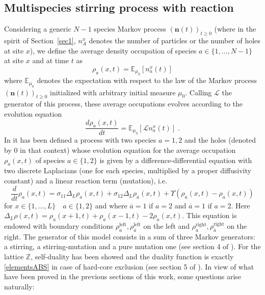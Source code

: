 \documentclass[10pt]{article}
\numberwithin{equation}{section}
\numberwithin{equation}{subsection}
\newcommand{\dt}{\;.}
\begin{document}
\subsection{Multispecies stirring process with reaction} \label{Subsection-RD}
{\color{black}  Considering a generic $N-1$ species Markov process $(\bm{n}(t))_{t\geq 0}$ (where in the spirit of Section~\ref{sec1}, $n_{A}^{x}$ denotes the number of particles or the number of holes at site $x$), we define the average density occupation of species $a\in\{1,\ldots,N-1\}$ at site $x$ and at time $t$ as
\begin{equation}
	\rho_{a}(x,t)=\mathbb{E}_{\mu_{0}}\left[n_{a}^{x}(t)\right]
\end{equation}
where $\mathbb{E}_{\mu_{0}}$ denotes the expectation with respect to the law of the Markov process $(\bm{n}(t))_{t\geq 0}$ initialized with arbitrary initial measure $\mu_{0}$. Calling
$\mathcal{L}$ the generator of this process, these average occupations evolves according to the evolution equation
\begin{equation}\label{EE-density}
	\frac{d \rho_{a}(x,t)}{dt}=\mathbb{E}_{\mu_{0}}\left[\mathcal{L}n_{a}^{x}(t)\right]\dt
\end{equation} }
In \cite{casini2022uphill} {\color{black}it has been defined a process with two species $a=1,2$ and the holes (denoted by $0$ in that context)} whose evolution equation for the average occupation $\rho_{a}(x,t)$ of species $a\in \{1,2\}$ is given by a difference-differential equation with two discrete Laplacians (one for each species, multiplied by a proper diffusivity constant) and a linear reaction term (mutation), i.e.
\begin{equation}\label{2SpeciesRD}
	\frac{d}{dt} \rho_{a}(x,t)=\sigma_{11}\Delta_{L}\rho_{a}(x,t)+\sigma_{12}\Delta_{L}\rho_{\overline{a}}(x,t)+\Upsilon\left(\rho_{\overline{a}}(x,t)-\rho_{a}(x,t)\right)
\end{equation} 
for $ x\in\{1,\ldots,L\}\quad a\in\{1,2\}$  and where $\overline{a}=1$ if $a=2$ and $\overline{a}=1$ if $a=2$. Here $\Delta_{L}\rho(x,t)=\rho_{a}(x+1,t)+\rho_{a}(x-1,t)-2\rho_{a}(x,t)$.
This equation is endowed with boundary conditions $\rho_{a}^{\text{left}},\rho_{\overline{a}}^{\text{left}}$ on the left and $\rho_{a}^{\text{right}},\rho_{\overline{a}}^{\text{right}}$ on the right. 
The generator of this model consists in a sum of three Markov generators: a stirring, a stirring-mutation and a pure mutation one (see section 4 of \cite{casini2022uphill}). For the lattice $\mathbb{Z}$, self-duality has been showed and the duality function is exactly \eqref{elementsABS} in case of hard-core exclusion (see section 5 of \cite{casini2022uphill}). In view of what have been proved in the previous sections of this work, some questions arise naturally:
\end{document}
